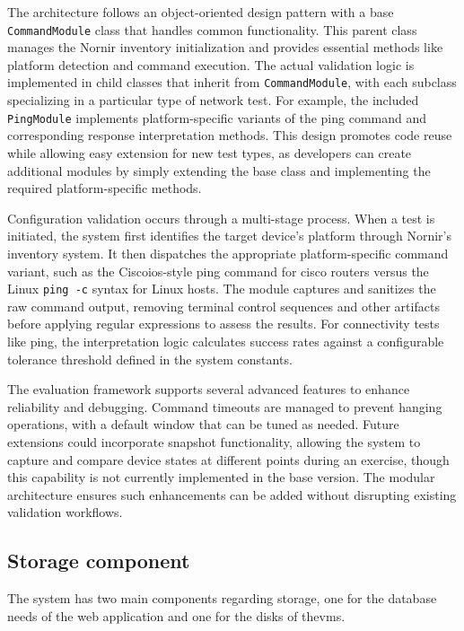         The architecture follows an object-oriented design pattern with a base \texttt{CommandModule} class that handles common functionality. 
        This parent class manages the Nornir inventory initialization and provides essential methods like platform detection and command execution. 
        The actual validation logic is implemented in child classes that inherit from \texttt{CommandModule}, with each subclass specializing in 
        a particular type of network test. For example, the included \texttt{PingModule} implements platform-specific variants of the ping command 
        and corresponding response interpretation methods. This design promotes code reuse while allowing easy extension for new test types, as 
        developers can create additional modules by simply extending the base class and implementing the required platform-specific methods.
        
        Configuration validation occurs through a multi-stage process. When a test is initiated, the system first identifies the target device's 
        platform through Nornir's inventory system. It then dispatches the appropriate platform-specific command variant, such as the Cisco\ac{ios}-style 
        ping command for cisco routers versus the Linux \texttt{ping -c} syntax for Linux hosts. The module captures and sanitizes the raw command output, 
        removing terminal control sequences and other artifacts before applying regular expressions to assess the results. For connectivity tests like 
        ping, the interpretation logic calculates success rates against a configurable tolerance threshold defined in the system constants.
        
        The evaluation framework supports several advanced features to enhance reliability and debugging. Command timeouts are managed to prevent 
        hanging operations, with a default window that can be tuned as needed. Future extensions could incorporate snapshot functionality, allowing 
        the system to capture and compare device states at different points during an exercise, though this capability is not currently implemented 
        in the base version. The modular architecture ensures such enhancements can be added without disrupting existing validation workflows.

    \subsection{Storage component}
        
        The system has two main components regarding storage, one for the database needs of the web application and one for the disks of the\ac{vm}s.


